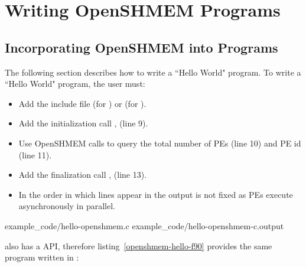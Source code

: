 \clearpage

\appendix

\pagestyle{fancy} \withlinenumbers
\fancyhf{}
\fancyhead[RE, LO]{\leftmark}
\fancyhead[RO, LE]{\thepage}
\fancyfoot[CE,CO]{\thepage}
\renewcommand{\headrulewidth}{0pt}




\chapter{Writing OpenSHMEM Programs}
\section*{Incorporating OpenSHMEM into Programs}\label{sec:writing_programs}

The following section describes how to write a ``Hello World" \openshmem program.
To write a ``Hello World" \openshmem program, the user must: 

\begin{itemize}
\item Add the include file  (for \Cstd) or  (for \Fortran).
\item Add the initialization call , (line 9).
\item Use OpenSHMEM calls to query the total number of \acp{PE} (line 10) and \ac{PE}
    id (line 11).
\item Add the finalization call , (line 13).
\item In \openshmem the order in which lines appear in the output is not fixed
    as \acp{PE} execute asynchronously in parallel.
\end{itemize}

\begin{minipage}{\linewidth}
\vspace{0.1in}
                {example_code/hello-openshmem.c}
                {example_code/hello-openshmem-c.output}
\vspace{0.1in}
\end{minipage}

\openshmem also has a \Fortran API, therefore listing~\ref{openshmem-hello-f90} provides the same program written in \Fortran:


